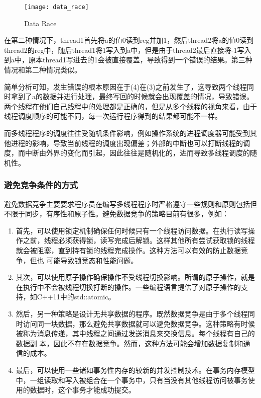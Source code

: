 \begin{figure}[ht]
    \centering
    \texttt{[image: data\_race]}
    \caption{\label{fig:data_race}Data Race}
\end{figure}


在第二种情况下，thread1首先将a的值0读到reg并加1，然后thread2将a的值0读到thread2的reg中，随后thread1将1写入到a中，但是由于thread2最后直接将-1写入到a中，原本thread1写进去的1会被直接覆盖，导致得到一个错误的结果。第三种情况和第二种情况类似。

简单分析可知，发生错误的根本原因在于(4)在(3)之前发生了，这导致两个线程同时拿到了a的数据并进行处理，最终写回的时候就会出现覆盖的情况，导致错误。两个线程在他们自己线程中的处理都是正确的，但是从多个线程的视角来看，由于线程调度顺序的可能不同，每一次运行程序得到的结果都可能不一样。

而多线程程序的调度往往受随机条件影响，例如操作系统的进程调度器可能受到其他进程的影响，导致当前线程的调度出现偏差；外部的中断也可以打断线程的调度，而中断由外界的变化而引起，因此往往是随机化的，进而导致多线程调度的随机性。

\subsubsection{避免竞争条件的方式}

避免数据竞争主要要求程序员在编写多线程程序时严格遵守一些规则和原则包括但不限于同步，有序性和原子性。避免数据竞争的策略目前有很多，例如：

\begin{enumerate}
\item 首先，可以使用锁定机制确保任何时候只有一个线程访问数据。在执行读写操作之前，线程必须获得锁，读写完成后解锁。这样其他所有尝试获取锁的线程就会被阻塞，直到持有锁的线程完成操作。这种方法可以有效的防止数据竞争，但也 可能导致锁竞态和性能问题。
\item 其次，可以使用原子操作确保操作不受线程切换影响。所谓的原子操作，就是在执行中不会被线程切换打断的操作。一些编程语言提供了对原子操作的支持，如C++11中的std::atomic。
\item 然后，另一种策略是设计无共享数据的程序。既然数据竞争是由于多个线程同时访问同一块数据，那么避免共享数据就可以避免数据竞争。这种策略有时候被称为消息传递，其中线程之间通过发送消息来交换信息。每个线程有自己的数据副 本，因此不存在数据竞争。然而，这种方法可能会增加数据复制和通信的成本。
\item 最后，可以使用一些诸如事务性内存的较新的并发控制技术。在事务内存模型中，一组读取和写入被组合在一个事务中，只有当没有其他线程访问被事务使用的数据时，这个事务才能成功提交。
\end{enumerate}

